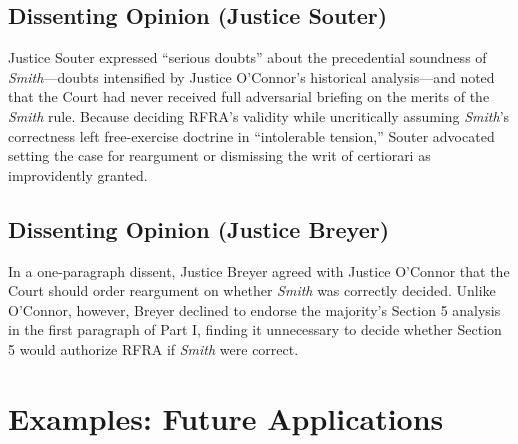 \documentclass[12pt]{article}
\begin{document}
\subsection{Dissenting Opinion (Justice Souter)}

Justice Souter expressed ``serious doubts'' about the precedential soundness of \textit{Smith}---doubts intensified by Justice O'Connor's historical analysis---and noted that the Court had never received full adversarial briefing on the merits of the \textit{Smith} rule. Because deciding RFRA's validity while uncritically assuming \textit{Smith}'s correctness left free-exercise doctrine in ``intolerable tension,'' Souter advocated setting the case for reargument or dismissing the writ of certiorari as improvidently granted.

\subsection{Dissenting Opinion (Justice Breyer)}

In a one-paragraph dissent, Justice Breyer agreed with Justice O'Connor that the Court should order reargument on whether \textit{Smith} was correctly decided. Unlike O'Connor, however, Breyer declined to endorse the majority's Section 5 analysis in the first paragraph of Part I, finding it unnecessary to decide whether Section 5 would authorize RFRA if \textit{Smith} were correct.

\section{Examples: Future Applications}
\end{document}
